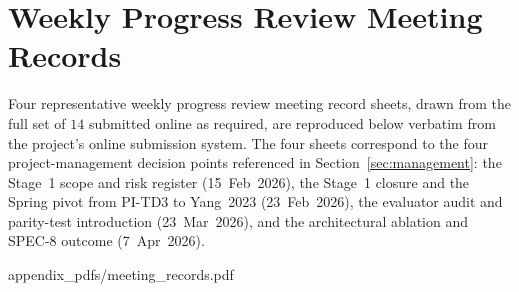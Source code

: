 \documentclass{unnc-fyp}
\begin{document}
\chapter{Weekly Progress Review Meeting Records}
\label{app:meetings}

Four representative weekly progress review meeting record
sheets, drawn from the full set of $14$ submitted online as
required, are reproduced below verbatim from the project's
online submission system. The four sheets correspond to the four
project-management decision points referenced in
Section~\ref{sec:management}: the Stage~1 scope and risk register
(15~Feb~2026), the Stage~1 closure and the Spring pivot from
PI-TD3 to Yang~2023 (23~Feb~2026), the evaluator audit and
parity-test introduction (23~Mar~2026), and the architectural
ablation and SPEC-8 outcome (7~Apr~2026).

%
           {appendix_pdfs/meeting_records.pdf}


\cleardoublepage
{}
{}
\renewcommand{\bibname}{References}


\end{document}
